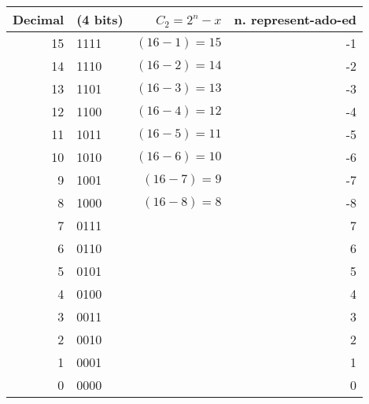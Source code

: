  \begin{table}
 \centering
 \begin{tabular}{r  l  r  r}
 Decimal&  (4 bits) &\ $C_2=2^n-x$ & n. represent-ado-ed\\
 \hline
15& 1111&$(16-1)=15$&-1\\
14& 1110&$(16-2)=14$&-2\\
13& 1101&$(16-3)=13$&-3\\
12& 1100&$(16-4)=12$&-4\\
11& 1011&$(16-5)=11$&-5\\
10& 1010&$(16-6)=10$&-6\\
9& 1001& $(16- 7)=9$&-7\\
8& 1000& $(16-8)=8$&-8\\
\hline
\hline
7& 0111& & 7\\
6& 0110& & 6\\
5& 0101& & 5\\
4& 0100& & 4\\
3& 0011& & 3\\
2& 0010& & 2\\
1& 0001& & 1\\
0& 0000& & 0\\
\hline
\end{tabular}
\label{tabla:c2}
 \end{table}
 
